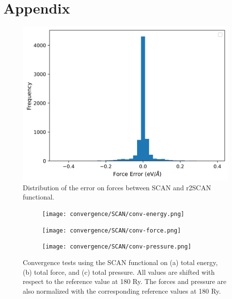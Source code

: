 \chapter*{Appendix}

\renewcommand{\thefigure}{A.\arabic{figure}}
\setcounter{figure}{0}

\begin{figure}[h!]
    \centering

    \includegraphics[width=0.7\linewidth]{images/scan_vs_r2scan/r2scan_hist_force.png}
    \caption{Distribution of the error on forces between SCAN and r2SCAN
        functional.
    }
    \label{fig:scan_r2scan_F_dist}
\end{figure}

\begin{figure}[tbhp]
    \centering
    \begin{subfigure}{0.32\textwidth}
        \centering
        \texttt{[image: convergence/SCAN/conv-energy.png]}
        \caption{}
    \end{subfigure}
    \hfill
    \begin{subfigure}{0.32\textwidth}
        \centering
        \texttt{[image: convergence/SCAN/conv-force.png]}
        \caption{}
    \end{subfigure}
    \hfill
    \begin{subfigure}{0.32\textwidth}
        \centering

        \texttt{[image: convergence/SCAN/conv-pressure.png]}
        \caption{}
    \end{subfigure}
    \caption{Convergence tests using the SCAN functional on (a) total energy,
        (b) total force, and (c) total pressure. All values are shifted
        with respect to the reference value at 180 Ry. The forces and pressure
        are also normalized with the corresponding reference values at 180 Ry.}
    \label{fig:conv_scan}
\end{figure}

